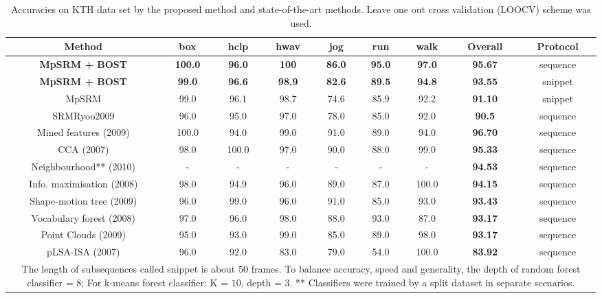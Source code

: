 \begin{table}
\centering
{\footnotesize
\begin{tabular}{|c|c|c|c|c|c|c|c|c|}
\hline
Method & box & hclp & hwav & jog & run & walk & \textbf{ Overall} & Protocol \\
\hline
\textbf{ \color{blue} MpSRM + BOST} & \textbf{ \color{blue} 100.0} & \textbf{ \color{blue}96.0} & \textbf{ \color{blue}100} & \textbf{ \color{blue}86.0} & \textbf{ \color{blue}95.0} & \textbf{ \color{blue}97.0} & \textbf{ \color{blue}95.67} & sequence\\
\textbf{ \color{blue} MpSRM + BOST} & \textbf{ \color{blue} 99.0} & \textbf{ \color{blue} 96.6} & \textbf{ \color{blue}98.9} & \textbf{ \color{blue}82.6} & \textbf{ \color{blue}89.5} & \textbf{ \color{blue}94.8} & \textbf{ \color{blue} 93.55} & snippet\\
MpSRM & 99.0 & 96.1 & 98.7 & 74.6 & 85.9 & 92.2 & \textbf{ 91.10} & snippet\\
SRM{Ryoo2009} & 96.0 & 95.0 & 97.0 & 78.0 & 85.0 & 92.0 & \textbf{ 90.5} & sequence\\
\hline
Mined features (2009) \cite{Gilbert2009} & 100.0 & 94.0 & 99.0 & 91.0 & 89.0 & 94.0 & \textbf{ 96.70} & sequence\\
CCA (2007) \cite{Kim2007} & 98.0 & 100.0 & 97.0 & 90.0 & 88.0 & 99.0 & \textbf{ 95.33} & sequence\\
Neighbourhood** (2010) \cite{Kovashka2010} & - & - & - & - & - & - & \textbf{ 94.53} & sequence\\
Info. maximisation (2008) \cite{Liu2008} & 98.0 & 94.9 & 96.0 & 89.0 & 87.0 & 100.0 & \textbf{ 94.15} & sequence\\
Shape-motion tree (2009) \cite{Lin2009} & 96.0 & 99.0 & 96.0 & 91.0 & 85.0 & 93.0 & \textbf{ 93.43} & sequence\\
Vocabulary forest (2008) \cite{Mikolajczyk2008} & 97.0 & 96.0 & 98.0 & 88.0 & 93.0 & 87.0 & \textbf{ 93.17} & sequence\\
Point Clouds (2009) \cite{Bregonzio2009} & 95.0 & 93.0 & 99.0 & 85.0 & 89.0 & 98.0 & \textbf{ 93.17} & sequence\\
pLSA-ISA (2007) \cite{Wong2007} & 96.0 & 92.0 & 83.0 & 79.0 & 54.0 & 100.0 & \textbf{ 83.92} & sequence\\
\hline
\multicolumn{9}{p{0.9\linewidth}}{\scriptsize * The length of subsequences called snippet is about 50 frames. To balance accuracy, speed and generality, the depth of random forest classifier = $8$; For k-means forest classifier: K = $10$, depth = $3$. ** Classifiers were trained by a split dataset in separate scenarios.
}\\
\end{tabular}
}
\caption{Accuracies on KTH data set by the proposed method and state-of-the-art methods. Leave one out cross validation (LOOCV) scheme was used.}
\label{tab:compare}
\end{table}

